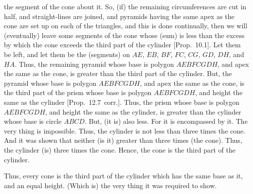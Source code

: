 \begin{Parallel}{}{}
{the segment of the cone about it. So, (if) the remaining circumferences are cut in half, and straight-lines
are joined, and pyramids having the same apex as the cone are set up on each of the triangles, and this is
done continually, then we will (eventually) leave some segments of the cone 
whose (sum) is less than
the excess by which the cone exceeds the third part of the cylinder [Prop.~10.1]. 
Let them be left, and let them be the (segments) on $AE$, $EB$, $BF$, $FC$, $CG$, $GD$,
$DH$, and $HA$. Thus, the remaining pyramid whose base is polygon $AEBFCGDH$, and apex the
same as the cone, is greater than the third part of the cylinder. But, the pyramid whose base is
polygon $AEBFCGDH$, and apex the same as the cone, is the third part of the prism whose base
is polygon $AEBFCGDH$, and height the same as the cylinder [Prop.~12.7~corr.].
Thus, the prism whose base is polygon $AEBFCGDH$, and height the same as the cylinder, is greater than
the cylinder whose base is circle $ABCD$. But, (it is) also less. For it is encompassed by it. The very thing
is impossible. Thus, the cylinder is not less than three times the cone. And it was shown that neither (is it)
greater than three times (the cone). Thus, the cylinder (is) three times the cone. Hence, the cone is the
third part of the cylinder.

Thus, every cone is the third part of the cylinder which has the same base as it, and an equal height.
(Which is) the very thing it was required to show.}
\end{Parallel}

